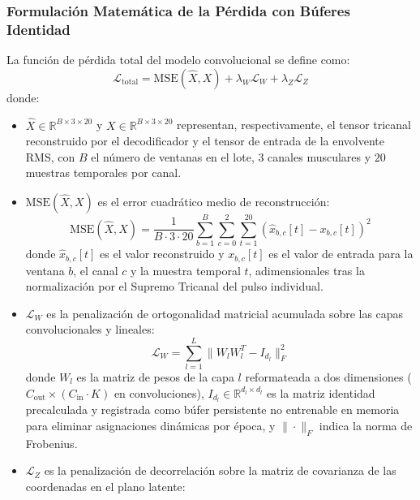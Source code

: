 \documentclass[11pt,a4paper,openany]{book}
\theoremstyle{definition}
\begin{document}
\subsubsection{Formulación Matemática de la Pérdida con Búferes Identidad}
\label{subsubsec:perdida_conv_ortogonal}

La función de pérdida total del modelo convolucional se define como:
\begin{equation}
    \mathcal{L}_{\text{total}} = \text{MSE}(\hat{X}, X) + \lambda_W \mathcal{L}_W + \lambda_Z \mathcal{L}_Z
\end{equation}
donde:
\begin{itemize}
    \item $\hat{X} \in \mathbb{R}^{B \times 3 \times 20}$ y $X \in \mathbb{R}^{B \times 3 \times 20}$ representan, respectivamente, el tensor tricanal reconstruido por el decodificador y el tensor de entrada de la envolvente RMS, con $B$ el número de ventanas en el lote, $3$ canales musculares y $20$ muestras temporales por canal.
    \item $\text{MSE}(\hat{X}, X)$ es el error cuadrático medio de reconstrucción:
    \begin{equation}
        \text{MSE}(\hat{X}, X) = \frac{1}{B \cdot 3 \cdot 20} \sum_{b=1}^B \sum_{c=0}^2 \sum_{t=1}^{20} (\hat{x}_{b, c}[t] - x_{b, c}[t])^2
    \end{equation}
    donde $\hat{x}_{b, c}[t]$ es el valor reconstruido y $x_{b, c}[t]$ es el valor de entrada para la ventana $b$, el canal $c$ y la muestra temporal $t$, adimensionales tras la normalización por el Supremo Tricanal del pulso individual.
    \item $\mathcal{L}_W$ es la penalización de ortogonalidad matricial acumulada sobre las capas convolucionales y lineales:
    \begin{equation}
        \mathcal{L}_W = \sum_{l=1}^L \|W_l W_l^T - I_{d_l}\|_F^2
    \end{equation}
    donde $W_l$ es la matriz de pesos de la capa $l$ reformateada a dos dimensiones ($C_{\text{out}} \times (C_{\text{in}} \cdot K)$ en convoluciones), $I_{d_l} \in \mathbb{R}^{d_l \times d_l}$ es la matriz identidad precalculada y registrada como búfer persistente no entrenable en memoria para eliminar asignaciones dinámicas por época, y $\|\cdot\|_F$ indica la norma de Frobenius.
    \item $\mathcal{L}_Z$ es la penalización de decorrelación sobre la matriz de covarianza de las coordenadas en el plano latente:
    \begin{equation}

\end{equation}
\end{itemize}
\end{document}
